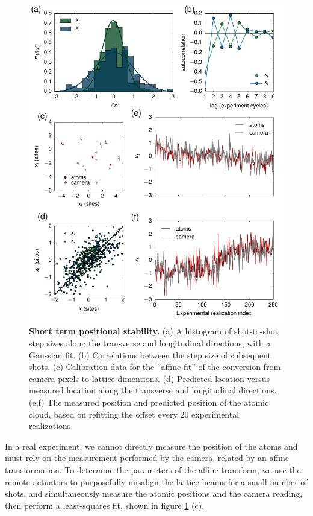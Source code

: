 \documentclass[twocolumn,aps,pra,showpacs,preprintnumbers,bibnotes]{revtex4-1}
\begin{document}
\begin{figure}
  \begin{center}
    \includegraphics{fig/pointing_figure.pdf}
    \caption{\textbf{Short term positional stability.} (a) A histogram of shot-to-shot step sizes along the transverse and longitudinal directions, with a Gaussian fit. (b) Correlations between the step size of subsequent shots. (c) Calibration data for the ``affine fit'' of the conversion from camera pixels to lattice dimentions. (d) Predicted location versus measured location along the transverse and longitudinal directions. (e,f) The measured position and predicted position of the atomic cloud, based on refitting the offset every $20$ experimental realizations.}\label{fig:stability}
  \end{center}
\end{figure}

In a real experiment, we cannot directly measure the position of the atoms and must rely on the measurement performed by the camera, related by an affine transformation.
To determine the parameters of the affine transform, we use the remote actuators to purposefully misalign the lattice beams for a small number of shots, and simultaneously measure the atomic positions and the camera reading, then perform a least-squares fit, shown in figure \ref{fig:stability} (c).
\end{document}
